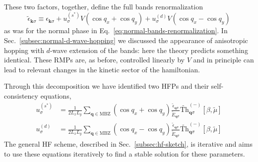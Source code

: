 These two factors, together, define the full bands renormalization
\begin{equation}\label{eq:af-bands-renormalization}
	\tilde{\epsilon}_{\mathbf{k}\sigma} \equiv \epsilon_{\mathbf{k}\sigma} + u^{(s^*)}_\sigma V (\cos q_x + \cos q_y) + u^{(d)}_\sigma V (\cos q_x - \cos q_y)
\end{equation}
as was for the normal phase in Eq.~\eqref{eq:normal-bands-renormalization}. In Sec.~\ref{subsec:normal-d-wave-hopping} we discussed the appearance of anisotropic hopping with $d$-wave extension of the bands: here the theory predicts something identical. These RMPs are, as before, controlled linearly by $V$ and in principle can lead to relevant changes in the kinetic sector of the hamiltonian.

Through this decomposition we have identified two HFPs and their self-consistency equations,
\begin{align}
	u^{(s^*)}_\sigma &= \frac{1}{2L_x L_y} \sum_{\mathbf{q}\in\mathrm{MBZ}} (\cos q_x + \cos q_y)
	\frac{\tilde{\epsilon}_{\mathbf{q}\sigma}}{\tilde{E}_{\mathbf{q}\sigma}} \tilde{\mathrm{Th}}_{\mathbf{q}\sigma}^{(-)}[\beta,\tilde{\mu}]
	\label{eq:af-uS-self-consistency}\\
	u^{(d)}_\sigma &= \frac{1}{2L_x L_y} \sum_{\mathbf{q}\in\mathrm{MBZ}} (\cos q_x - \cos q_y)
	\frac{\tilde{\epsilon}_{\mathbf{q}\sigma}}{\tilde{E}_{\mathbf{q}\sigma}} \tilde{\mathrm{Th}}_{\mathbf{q}\sigma}^{(-)}[\beta,\tilde{\mu}] \label{eq:af-ud-self-consistency}
\end{align}
The general HF scheme, described in Sec.~\ref{subsec:hf-sketch}, is iterative and aims to use these equations iteratively to find a stable solution for these parameters.


